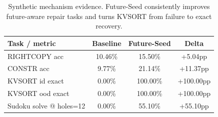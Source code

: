 \begin{table}[t]
\centering
\small
\caption{Synthetic mechanism evidence. Future-Seed consistently improves future-aware repair tasks and turns KVSORT from failure to exact recovery.}
\label{tab:synthetic-main}
\begin{tabular}{lccc}
\toprule
Task / metric & Baseline & Future-Seed & Delta \\
\midrule
RIGHTCOPY acc & 10.46\% & 15.50\% & +5.04pp \\
CONSTR acc & 9.77\% & 21.14\% & +11.37pp \\
KVSORT id exact & 0.00\% & 100.00\% & +100.00pp \\
KVSORT ood exact & 0.00\% & 100.00\% & +100.00pp \\
Sudoku solve @ holes=12 & 0.00\% & 55.10\% & +55.10pp \\
\bottomrule
\end{tabular}
\end{table}
